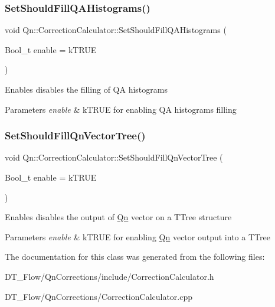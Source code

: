 \subsubsection{\texorpdfstring{Set\+Should\+Fill\+Q\+A\+Histograms()}{SetShouldFillQAHistograms()}}
{\footnotesize\ttfamily void Qn\+::\+Correction\+Calculator\+::\+Set\+Should\+Fill\+Q\+A\+Histograms (\begin{DoxyParamCaption}\item[{Bool\+\_\+t}]{enable = {\ttfamily kTRUE} }\end{DoxyParamCaption})\hspace{0.3cm}{\ttfamily [inline]}}

Enables disables the filling of QA histograms 
\begin{DoxyParams}{Parameters}
{\em enable} & k\+T\+R\+UE for enabling QA histograms filling \\
\hline
\end{DoxyParams}
\mbox{\label{classQn_1_1CorrectionCalculator_abfa3d7424b677f225d2e7c4f37d70e8a}} 
\subsubsection{\texorpdfstring{Set\+Should\+Fill\+Qn\+Vector\+Tree()}{SetShouldFillQnVectorTree()}}
{\footnotesize\ttfamily void Qn\+::\+Correction\+Calculator\+::\+Set\+Should\+Fill\+Qn\+Vector\+Tree (\begin{DoxyParamCaption}\item[{Bool\+\_\+t}]{enable = {\ttfamily kTRUE} }\end{DoxyParamCaption})\hspace{0.3cm}{\ttfamily [inline]}}

Enables disables the output of \mbox{\hyperlink{namespaceQn}{Qn}} vector on a T\+Tree structure 
\begin{DoxyParams}{Parameters}
{\em enable} & k\+T\+R\+UE for enabling \mbox{\hyperlink{namespaceQn}{Qn}} vector output into a T\+Tree \\
\hline
\end{DoxyParams}


The documentation for this class was generated from the following files\+:\begin{DoxyCompactItemize}
\item 
D\+T\+\_\+\+Flow/\+Qn\+Corrections/include/Correction\+Calculator.\+h\item 
D\+T\+\_\+\+Flow/\+Qn\+Corrections/Correction\+Calculator.\+cpp\end{DoxyCompactItemize}
